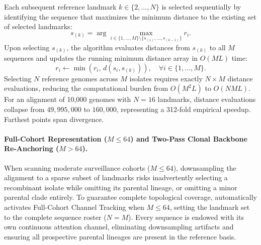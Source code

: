 Each subsequent reference landmark $k \in \{2, \dots, N\}$ is selected sequentially by identifying the sequence that maximizes the minimum distance to the existing set of selected landmarks:
\begin{equation}
s_{(k)} = \arg\max_{i \in \{1,\dots,M\} \setminus \{s_{(1)},\dots,s_{(k-1)}\}} r_i.
\label{eq:methods_fps_iter}
\end{equation}
Upon selecting $s_{(k)}$, the algorithm evaluates distances from $s_{(k)}$ to all $M$ sequences and updates the running minimum distance array in $O(M L)$ time:
\begin{equation}
r_i \leftarrow \min\left(r_i, \, d(s_i, s_{(k)})\right), \quad \forall i \in \{1, \dots, M\}.
\label{eq:methods_fps_update}
\end{equation}
Selecting $N$ reference genomes across $M$ isolates requires exactly $N \times M$ distance evaluations, reducing the computational burden from $O(M^2 L)$ to $O(N M L)$.
For an alignment of 10,000 genomes with $N = 16$ landmarks, distance evaluations collapse from $49,995,000$ to $160,000$, representing a 312-fold empirical speedup.
Farthest points span divergence.

\paragraph{Full-Cohort Representation ($M \le 64$) and Two-Pass Clonal Backbone Re-Anchoring ($M > 64$).}
When scanning moderate surveillance cohorts ($M \le 64$), downsampling the alignment to a sparse subset of landmarks risks inadvertently selecting a recombinant isolate while omitting its parental lineage, or omitting a minor parental clade entirely.
To guarantee complete topological coverage, \RhizAeon automatically activates Full-Cohort Channel Tracking when $M \le 64$, setting the landmark set to the complete sequence roster ($N = M$).
Every sequence is endowed with its own continuous attention channel, eliminating downsampling artifacts and ensuring all prospective parental lineages are present in the reference basis.

